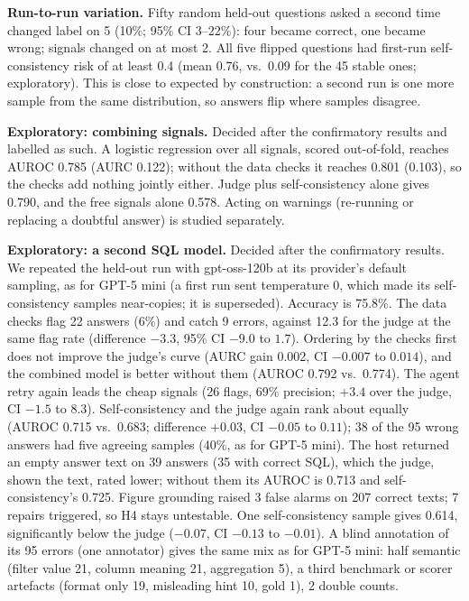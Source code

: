 \documentclass[10pt,twocolumn]{article}
\begin{document}
\textbf{Run-to-run variation.} Fifty random held-out questions asked a second time changed label on 5
(10\%; 95\% CI 3--22\%): four became correct, one became wrong; signals changed on at most 2. All five
flipped questions had first-run self-consistency risk of at least 0.4 (mean 0.76, vs.\ 0.09 for the
45 stable ones; exploratory). This is close to expected by construction: a second run is one more
sample from the same distribution, so answers flip where samples disagree.

\textbf{Exploratory: combining signals.} Decided after the confirmatory results and labelled as such.
A logistic regression over all signals, scored out-of-fold, reaches AUROC 0.785 (AURC 0.122); without
the data checks it reaches 0.801 (0.103), so the checks add nothing jointly either. Judge plus
self-consistency alone gives 0.790, and the free signals alone 0.578. Acting on warnings (re-running or
replacing a doubtful answer) is studied separately.

\textbf{Exploratory: a second SQL model.} Decided after the confirmatory results. We repeated the
held-out run with gpt-oss-120b at its provider's default sampling, as for GPT-5 mini (a first run sent
temperature 0, which made its self-consistency samples near-copies; it is superseded). Accuracy is
75.8\%. The data checks flag 22 answers (6\%) and catch 9 errors, against 12.3 for the judge at the same
flag rate (difference $-3.3$, 95\% CI $-9.0$ to $1.7$). Ordering by the checks first does not improve
the judge's curve (AURC gain 0.002, CI $-0.007$ to $0.014$), and the combined model is better without
them (AUROC 0.792 vs.\ 0.774). The agent retry again leads the cheap signals (26 flags, 69\% precision;
$+3.4$ over the judge, CI $-1.5$ to $8.3$). Self-consistency and the judge again rank about equally
(AUROC 0.715 vs.\ 0.683; difference $+0.03$, CI $-0.05$ to $0.11$); 38 of the 95 wrong answers had five
agreeing samples (40\%, as for GPT-5 mini). The host returned an empty answer text on 39 answers (35
with correct SQL), which the judge, shown the text, rated lower; without them its AUROC is 0.713 and
self-consistency's 0.725. Figure grounding raised 3 false alarms on 207 correct texts; 7 repairs
triggered, so H4 stays untestable. One self-consistency sample gives 0.614, significantly below the
judge ($-0.07$, CI $-0.13$ to $-0.01$). A blind annotation of its 95 errors (one annotator) gives the
same mix as for GPT-5 mini: half semantic (filter value 21, column meaning 21, aggregation 5), a third
benchmark or scorer artefacts (format only 19, misleading hint 10, gold 1), 2 double counts.
\end{document}
